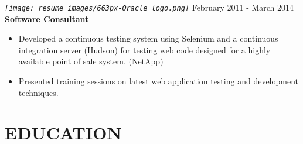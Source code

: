 \documentclass[12pt, line, margin]{res}
\begin{document}
\begin{resume}
            {\sl
              \texttt{[image: resume\_images/663px-Oracle\_logo.png]}
            }
            \hfill            February 2011 - March 2014 \\
            \textbf{Software Consultant}
            \begin{itemize}  \itemsep -2pt %
              \item Developed a continuous testing system using Selenium
                          and a continuous integration server (Hudson) for testing web code designed
                          for a highly available point of sale system. (NetApp)
              \item Presented training sessions on latest web application testing \newline
                          and development techniques.
            \end{itemize}

        \section{EDUCATION}
            \begin{multicols}{2} {
            }

            {
            }
            \end{multicols}


\end{resume}
\end{document}

